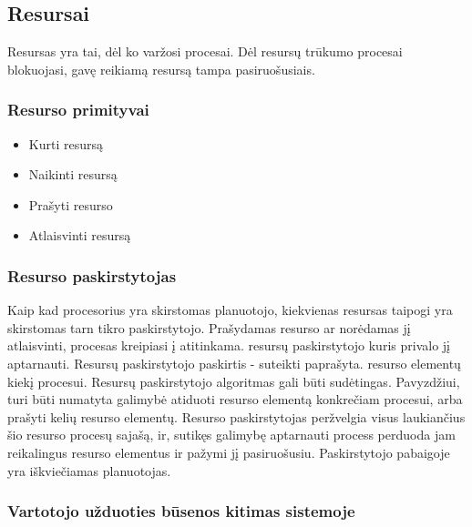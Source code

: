 \subsection{Resursai}
Resursas yra tai, dėl ko varžosi procesai. Dėl resursų trūkumo procesai blokuojasi, gavę reikiamą resursą tampa pasiruošusiais. 

\subsubsection{Resurso primityvai}
	\begin{itemize}
		\item Kurti resursą
		\item Naikinti resursą
		\item Prašyti resurso
		\item Atlaisvinti resursą
	\end{itemize}

\subsubsection{Resurso paskirstytojas}
Kaip kad procesorius yra skirstomas planuotojo, kiekvienas resursas taipogi yra skirstomas tarn tikro paskirstytojo. Prašydamas resurso ar norėdamas jį atlaisvinti, procesas kreipiasi į atitinkama. resursų paskirstytojo kuris privalo jį aptarnauti.
Resursų paskirstytojo paskirtis - suteikti paprašyta. resurso elementų kiekį procesui. Resursų paskirstytojo algoritmas gali būti sudėtingas. Pavyzdžiui, turi būti numatyta galimybė atiduoti resurso elementą konkrečiam procesui, arba prašyti kelių resurso elementų. Resurso paskirstytojas peržvelgia visus laukiančius šio resurso procesų sajašą, ir, sutikęs galimybę aptarnauti process perduoda jam reikalingus resurso elementus ir pažymi jį pasiruošusiu. Paskirstytojo pabaigoje yra iškviečiamas planuotojas.

\subsubsection{Vartotojo užduoties būsenos kitimas sistemoje}

